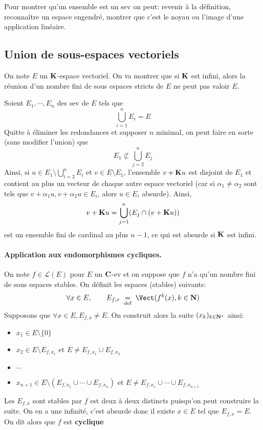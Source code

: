 \begin{rem}
    Pour montrer qu'un ensemble est un sev on peut: revenir à la définition, reconnaître un espace engendré, montrer que c'est le noyau ou l'image d'une application linéaire.
\end{rem}

\subsection{Union de sous-espaces vectoriels}

On note $E$ un  $\mathbf K$-espace vectoriel. On va montrer que si $\mathbf K$ est infini, alors la réunion d'un nombre fini de sous espaces stricts de $E$ ne peut pas valoir  $E$.

Soient $E_1, \cdots, E_n$ des sev de $E$ tels que \[
    \bigcup_{i=1}^nE_i=E
\]
Quitte à éliminer les redondances et supposer $n$ minimal, on peut faire en sorte (sans modifier l'union) que \[
    E_1\not\subset \bigcup_{j=2}^n E_j
\]
Ainsi, si $u\in E_1\setminus \bigcup_{i=2}^nE_i$ et $v\in E\setminus E_1$, l'ensemble $v+\mathbf K u$ est disjoint de $E_1$ et contient au plus un vecteur de chaque autre espace vectoriel (car si $\alpha_1\neq \alpha_2$ sont tels que $v+\alpha_1 u, v+\alpha_2 u \in E_i$, alors $u \in  E_i$ absurde). Ainsi, \[
    v+\mathbf K u= \bigcup_{j=1} ^n (E_j\cap (v + \mathbf K u))
\]
est un ensemble fini de cardinal au plus $n-1$, ce qui est absurde si  $\mathbf K$ est infini.

\paragraph{Application aux endomorphismes cycliques.} On note $f \in  \mathcal  L(E)$ pour $E$ un  $\mathbf C$-ev et on suppose que $f$ n'a qu'un nombre fini de sous espaces stables. On définit les espaces (stables) suivants: \[
    \forall  x \in  E, \qquad  E_{f,x}\defeq \Vect(f^{k}(x), k \in  \N)
\]
Supposons que $\forall  x \in  E, E_{f,x}\neq  E$. On construit alors la suite $(x_k)_{k \in  \mathbf N^\star}$ ainsi: \begin{itemize}
    \item $x_1 \in  E\setminus \{0\} $
    \item $ x_2 \in  E\setminus E_{f,x_1}$ et $E \neq  E_{f,x_1}\cup E_{f,x_2}$
    \item $\cdots $
    \item $x_{n+1} \in  E \setminus  (E_{f,x_1}\cup \cdots \cup E_{f,x_n})$ et $E \neq  E_{f,x_1}\cup \cdots \cup E_{f,x_{n+1}}$
\end{itemize}
Les $E_{f,x}$ sont stables par $f$ est deux à deux distincts puisqu'on peut construire la suite. On en a une infinité, c'est absurde donc il existe  $x \in  E$ tel que $E_{f,x}=E$. On dit alors que $f$ est  \textbf{cyclique}


